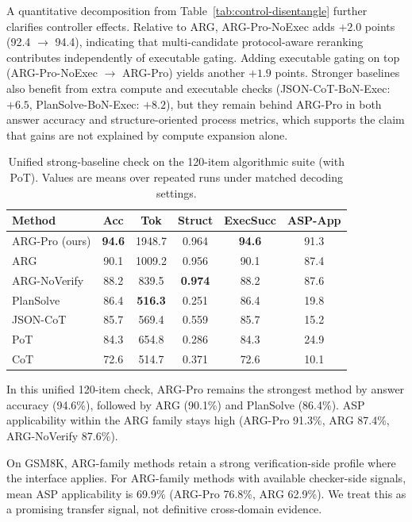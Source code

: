 \documentclass{article}
\begin{document}
A quantitative decomposition from Table~\ref{tab:control-disentangle} further clarifies controller effects. Relative to ARG, ARG-Pro-NoExec adds \(+2.0\) points (92.4 \(\rightarrow\) 94.4), indicating that multi-candidate protocol-aware reranking contributes independently of executable gating. Adding executable gating on top (ARG-Pro-NoExec \(\rightarrow\) ARG-Pro) yields another \(+1.9\) points. Stronger baselines also benefit from extra compute and executable checks (JSON-CoT-BoN-Exec: \(+6.5\), PlanSolve-BoN-Exec: \(+8.2\)), but they remain behind ARG-Pro in both answer accuracy and structure-oriented process metrics, which supports the claim that gains are not explained by compute expansion alone.

\begin{table}[t]
\centering
\scriptsize
\caption{Unified strong-baseline check on the 120-item algorithmic suite (with PoT). Values are means over repeated runs under matched decoding settings.}
\label{tab:pot-strong-baseline}
\setlength{\tabcolsep}{3.5pt}
\begin{tabular}{lccccc}
\toprule
\rowcolor{headband}
Method & Acc & Tok & Struct & ExecSucc & ASP-App \\
\midrule
\rowcolor{ourband}
ARG-Pro (ours) & \textbf{94.6} & 1948.7 & 0.964 & \textbf{94.6} & 91.3 \\
\rowcolor{ourband}
ARG & 90.1 & 1009.2 & 0.956 & 90.1 & 87.4 \\
\rowcolor{ourband}
ARG-NoVerify & 88.2 & 839.5 & \textbf{0.974} & 88.2 & 87.6 \\
PlanSolve & 86.4 & \textbf{516.3} & 0.251 & 86.4 & 19.8 \\
JSON-CoT & 85.7 & 569.4 & 0.559 & 85.7 & 15.2 \\
PoT & 84.3 & 654.8 & 0.286 & 84.3 & 24.9 \\
CoT & 72.6 & 514.7 & 0.371 & 72.6 & 10.1 \\
\bottomrule
\end{tabular}
\setlength{\tabcolsep}{6pt}
\end{table}

In this unified 120-item check, ARG-Pro remains the strongest method by answer accuracy (94.6\%), followed by ARG (90.1\%) and PlanSolve (86.4\%). ASP applicability within the ARG family stays high (ARG-Pro 91.3\%, ARG 87.4\%, ARG-NoVerify 87.6\%).

On GSM8K, ARG-family methods retain a strong verification-side profile where the interface applies. For ARG-family methods with available checker-side signals, mean ASP applicability is 69.9\% (ARG-Pro 76.8\%, ARG 62.9\%). We treat this as a promising transfer signal, not definitive cross-domain evidence.
\end{document}
